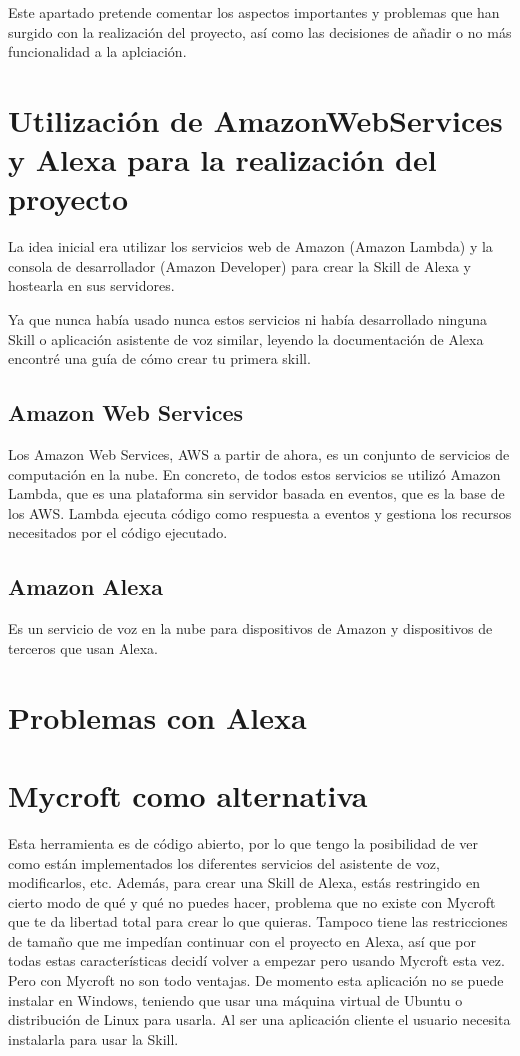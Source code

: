 
Este apartado pretende comentar los aspectos importantes y problemas que han surgido con la realización del proyecto, así como las decisiones de añadir o no más funcionalidad a la aplciación.
\section{Utilización de AmazonWebServices y Alexa para la realización del proyecto}
La idea inicial era utilizar los servicios web de Amazon (Amazon Lambda) y la consola de desarrollador (Amazon Developer) para crear la Skill de Alexa y hostearla en sus servidores.

Ya que nunca había usado nunca estos servicios ni había desarrollado ninguna Skill o aplicación asistente de voz similar, leyendo la documentación de Alexa encontré una guía de cómo crear tu primera skill.
\subsection{Amazon Web Services}
Los Amazon Web Services, AWS a partir de ahora, es un conjunto de servicios de computación en la nube. En concreto, de todos estos servicios se utilizó Amazon Lambda, que es una plataforma sin servidor basada en eventos, que es la base de los AWS. Lambda ejecuta código como respuesta a eventos y gestiona los recursos necesitados por el código ejecutado.
\subsection{Amazon Alexa}
Es un servicio de voz en la nube para dispositivos de Amazon y dispositivos de terceros que usan Alexa.
\section{Problemas con Alexa}
\section{Mycroft como alternativa}
Esta herramienta es de código abierto, por lo que tengo la posibilidad de ver como están implementados los diferentes servicios del asistente de voz, modificarlos, etc. Además, para crear una Skill de Alexa, estás restringido en cierto modo de qué y qué no puedes hacer, problema que no existe con Mycroft que te da libertad total para crear lo que quieras. Tampoco tiene las restricciones de tamaño que me impedían continuar con el proyecto en Alexa, así que por todas estas características decidí volver a empezar pero usando Mycroft esta vez.
Pero con Mycroft no son todo ventajas. De momento esta aplicación no se puede instalar en Windows, teniendo que usar una máquina virtual de Ubuntu o distribución de Linux para usarla. Al ser una aplicación cliente el usuario necesita instalarla para usar la Skill.
